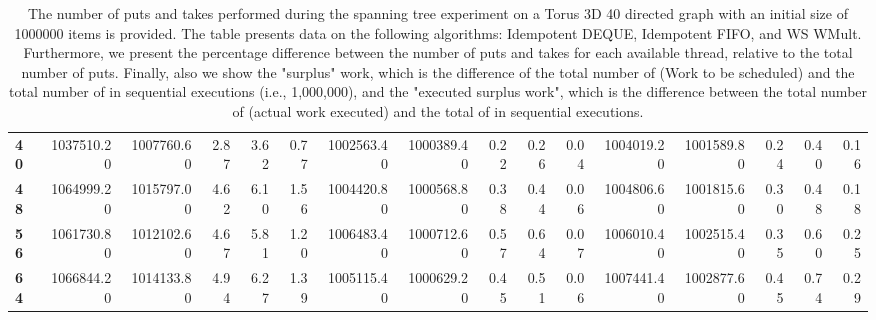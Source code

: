 \begin{table}[!ht]
{\begin{tabular}{lrrrrrrrrrrrrrrr}
\textbf{40} &       1037510.20 & 1007760.60 &           2.87 &        3.62 &                 0.77 &      1002563.40 & 1000389.40 &           0.22 &        0.26 &                 0.04 & 1004019.20 & 1001589.80 &           0.24 &        0.40 &                 0.16 \\
\textbf{48} &       1064999.20 & 1015797.00 &           4.62 &        6.10 &                 1.56 &      1004420.80 & 1000568.80 &           0.38 &        0.44 &                 0.06 & 1004806.60 & 1001815.60 &           0.30 &        0.48 &                 0.18 \\
\textbf{56} &       1061730.80 & 1012102.60 &           4.67 &        5.81 &                 1.20 &      1006483.40 & 1000712.60 &           0.57 &        0.64 &                 0.07 & 1006010.40 & 1002515.40 &           0.35 &        0.60 &                 0.25 \\
\textbf{64} &       1066844.20 & 1014133.80 &           4.94 &        6.27 &                 1.39 &      1005115.40 & 1000629.20 &           0.45 &        0.51 &                 0.06 & 1007441.40 & 1002877.60 &           0.45 &        0.74 &                 0.29 \\
\bottomrule
\end{tabular}}
\label{difference-Torus_3D_40_directed-1000000-IDEMPOTENT_DEQUE-IDEMPOTENT_FIFO-WS_NC_MULT_OPT}
\caption{The number of puts and takes performed during the
    spanning tree experiment on a Torus 3D 40 directed graph with an initial size
    of 1000000 items is provided. The table presents data on the
    following algorithms: Idempotent DEQUE, Idempotent FIFO, and
    WS WMult. Furthermore, we present the percentage difference
    between the number of puts and takes for each available thread,
    relative to the total number of puts. Finally, also we show the
    "surplus" work, which is the difference of the total number of
    \Puts (Work to be scheduled) and the total number of \Puts in
    sequential executions (i.e., 1,000,000), and the "executed surplus
    work", which is the difference between the total number of \Takes
    (actual work executed) and the total of \Takes in sequential
    executions.}
\end{table}
